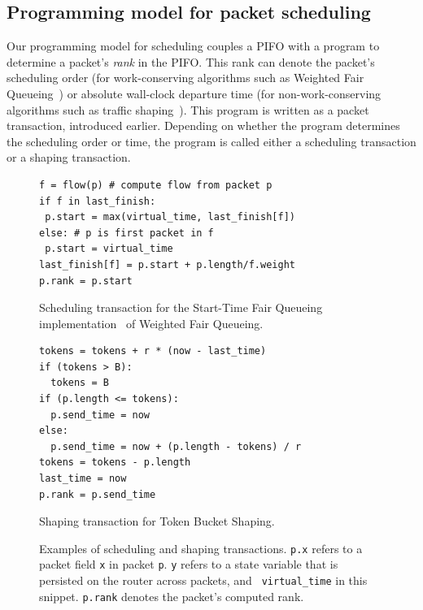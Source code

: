 \subsection{Programming model for packet scheduling} Our programming model for
scheduling couples a PIFO with a program to determine a packet's {\em rank} in
the PIFO. This rank can denote the packet's scheduling order (for
work-conserving algorithms such as Weighted Fair Queueing~\cite{wfq}) or
absolute wall-clock departure time (for non-work-conserving algorithms such as
traffic shaping~\cite{tbf}). This program is written as a packet transaction,
introduced earlier.  Depending on whether the program determines the scheduling
order or time, the program is called either a scheduling transaction or a
shaping transaction.

\begin{figure}
\begin{minipage}[!h]{0.48\textwidth}
\vspace{0.4in}
\begin{lstlisting}[style=customcscriptsize]
f = flow(p) # compute flow from packet p
if f in last_finish:
 p.start = max(virtual_time, last_finish[f])
else: # p is first packet in f
 p.start = virtual_time
last_finish[f] = p.start + p.length/f.weight
p.rank = p.start
\end{lstlisting}
\caption{Scheduling transaction for the Start-Time Fair Queueing
implementation~\cite{stfq} of Weighted Fair Queueing.}
\label{fig:wfq_trans}
\hfill
\end{minipage}
\begin{minipage}[!h]{0.48\textwidth}
\begin{lstlisting}[style=customcscriptsize]
tokens = tokens + r * (now - last_time)
if (tokens > B):
  tokens = B
if (p.length <= tokens):
  p.send_time = now
else:
  p.send_time = now + (p.length - tokens) / r
tokens = tokens - p.length
last_time = now
p.rank = p.send_time
\end{lstlisting}
\caption{Shaping transaction for Token Bucket Shaping.}
\label{fig:tbf_trans}
\end{minipage}
\caption{Examples of scheduling and shaping transactions. {\tt p.x} refers to a
packet field {\tt x} in packet {\tt p}.  {\tt y} refers to a state variable
that is persisted on the router across packets,  and {\tt
virtual\_time} in this snippet. {\tt p.rank} denotes the packet's computed
rank.}
\end{figure}

